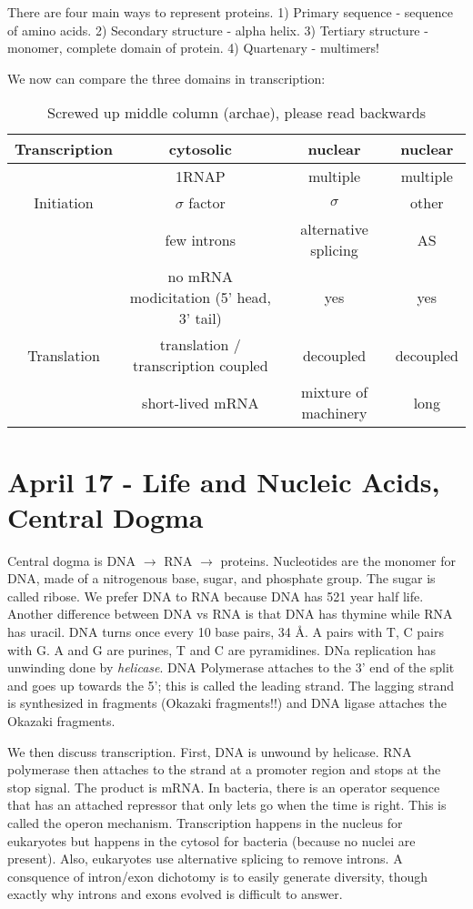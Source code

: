 \documentclass[12pt]{article}
\begin{document}
There are four main ways to represent proteins. 1) Primary sequence - sequence of amino acids. 2) Secondary structure - alpha helix. 3) Tertiary structure - monomer, complete domain of protein. 4) Quartenary - multimers!

We now can compare the three domains in transcription:

\begin{table}
	\centering
	\begin{tabular}{|c|c|c|c|}
		\hline
		Transcription & cytosolic & nuclear & nuclear\\\hline
		&1RNAP & multiple  & multiple \\\hline
		Initiation & $\sigma$ factor & $\sigma$& other \\\hline
		&few introns & alternative splicing & AS \\\hline
		&no mRNA modicitation (5' head, 3' tail) & yes & yes\\\hline
		Translation & translation / transcription coupled & decoupled & decoupled\\\hline
		&short-lived mRNA & mixture of machinery& long \\\hline
	\end{tabular}
	\caption{Screwed up middle column (archae), please read backwards}
\end{table}



\section*{April 17 - Life and Nucleic Acids, Central Dogma}

Central dogma is DNA $\to$ RNA $\to$ proteins. Nucleotides are the monomer for DNA, made of a nitrogenous base, sugar, and phosphate group. The sugar is called ribose. We prefer DNA to RNA because DNA has 521 year half life. Another difference between DNA vs RNA is that DNA has thymine while RNA has uracil. DNA turns once every 10 base pairs, 34 \AA. A pairs with T, C pairs with G. A and G are purines, T and C are pyramidines. DNa replication has unwinding done by \emph{helicase}. DNA Polymerase attaches to the 3' end of the split and goes up towards the 5'; this is called the leading strand. The lagging strand is synthesized in fragments (Okazaki fragments!!) and DNA ligase attaches the Okazaki fragments.  

We then discuss transcription. First, DNA is unwound by helicase. RNA polymerase then attaches to the strand at a promoter region and stops at the stop signal. The product is mRNA. In bacteria, there is an operator sequence that has an attached repressor that only lets go when the time is right. This is called the operon mechanism. Transcription happens in the nucleus for eukaryotes but happens in the cytosol for bacteria (because no nuclei are present). Also, eukaryotes use alternative splicing to remove introns. A consquence of intron/exon dichotomy is to easily generate diversity, though exactly why introns and exons evolved is difficult to answer. 
\end{document}
